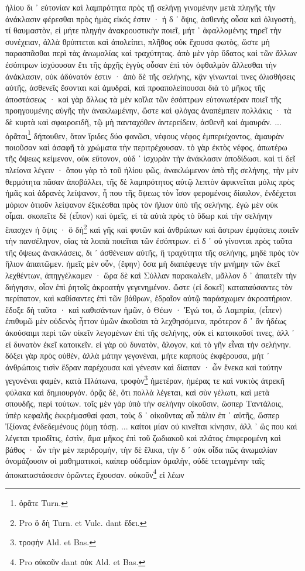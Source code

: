 \documentclass[a4paper, 11pt, oneside, polutonikogreek, german]{article}
\begin{document}
ἡλίου δι ᾽ εὐτονίαν καὶ λαμπρότητα πρὸς τῇ σελήνῃ γινομένην μετὰ πληγῆς τὴν ἀνάκλασιν φέρεσθαι πρὸς ἡμὰς εἰκός ἐστιν · ἡ δ ᾽ ὄψις, ἀσθενὴς οὖσα καὶ ὀλιγοστὴ, τί θαυμαστὸν, εἰ μήτε πληγὴν ἀνακρουστικὴν ποιεῖ, μήτ ᾽ ἀφαλλομένης τηρεῖ τὴν συνέχειαν, ἀλλὰ θρύπτεται καὶ ἀπολείπει, πλῆθος οὐκ ἔχουσα φωτὸς, ὥστε μὴ παρασπᾶσθαι περὶ τὰς ἀνωμαλίας καὶ τραχύτητας. ἀπὸ μὲν γὰρ ὕδατος καὶ τῶν ἄλλων ἐσόπτρων ἰσχύουσαν ἔτι τῆς ἀρχῆς ἐγγὺς οὖσαν ἐπὶ τὸν ὀφθαλμὸν ἅλλεσθαι τὴν ἀνάκλασιν, οὐκ ἀδύνατόν ἐστιν · ἀπὸ δὲ τῆς σελήνης, κᾂν γίνωνταὶ τινες ὀλισθήσεις αὐτῆς, ἀσθενεῖς ἔσονται καὶ ἀμυδραὶ, καὶ προαπολείπουσαι διὰ τὸ μῆκος τῆς ἀποστάσεως · καὶ γὰρ ἄλλως τὰ μὲν κοῖλα τῶν ἐσόπτρων εὐτονωτέραν ποιεῖ τῆς προηγουμένης αὐγῆς τὴν ἀνακλωμένην, ὥστε καὶ φλόγας ἀναπέμπειν πολλάκις · τὰ δὲ κυρτὰ καὶ σφαιροειδῆ, τῷ μὴ πανταχόθεν ἀντερείδειν, ἀσθενῆ καὶ ἀμαυράν. ... ὁρᾶται\footnote{ὁρᾶτε Turn.} δήπουθεν, ὅταν ἴριδες δύο φανῶσι, νέφους νέφος ἐμπεριέχοντος, ἀμαυρὰν ποιοῦσαν καὶ ἀσαφῆ τὰ χρώματα τὴν περιτρέχουσαν. τὸ γὰρ ἐκτὸς νέφος, ἀπωτέρω τῆς ὄψεως κείμενον, οὐκ εὔτονον, οὐδ ᾽ ἰσχυρὰν τὴν ἀνάκλασιν ἀποδίδωσι. καὶ τί δεῖ πλείονα λέγειν · ὅπου γὰρ τὸ τοῦ ἡλίου φῶς, ἀνακλώμενον ἀπὸ τῆς σελήνης, τὴν μὲν θερμότητα πᾶσαν ἀποβάλλει, τῆς δὲ λαμπρότητος αὐτῷ λεπτὸν ἀφικνεῖται μόλις πρὸς ἡμᾶς καὶ ἀδρανὲς λείψανον, ἦ που τῆς ὄψεως τὸν ἶσον φερομένοις δίαυλον, ἐνδέχεται μόριον ὁτιοῦν λείψανον ἐξικέσθαι πρὸς τὸν ἥλιον ὑπὸ τῆς σελήνης. ἐγὼ μὲν οὐκ οἶμαι. σκοπεῖτε δὲ (εἶπον) καὶ ὑμεῖς, εἰ τὰ αὐτὰ πρὸς τὸ ὕδωρ καὶ τὴν σελήνην ἔπασχεν ἡ ὄψις · ὃ δὴ\footnote{Pro ὃ δὴ Turn. et Vulc. dant ἔδει.} καὶ γῆς καὶ φυτῶν καὶ ἀνθρώπων καὶ ἄστρων ἐμφάσεις ποιεῖν τὴν πανσέληνον, οἵας τὰ λοιπὰ ποιεῖται τῶν ἐσόπτρων. εὶ δ ᾽ οὐ γίνονται πρὸς ταῦτα τῆς ὄψεως ἀνακλάσεις, δι ᾽ ἀσθένειαν αὐτῆς, ἢ τραχύτητα τῆς σελήνης, μηδὲ πρὸς τὸν ἥλιον ἀπαιτῶμεν. ἡμεῖς μὲν οὖν, (ἔφην) ὅσα μὴ διαπέφευγε τὴν μνήμην τῶν ἐκεῖ λεχθέντων, ἀπηγγέλκαμεν · ὥρα δὲ καὶ Σύλλαν παρακαλεῖν, μᾶλλον δ ᾽ ἀπαιτεῖν τὴν διήγησιν, οἷον ἐπὶ ῥητοῖς ἀκροατὴν γεγενημένον. ὥστε (εἰ δοκεῖ) καταπαύσαντες τὸν περίπατον, καὶ καθίσαντες ἐπὶ τῶν βάθρων, ἑδραῖον αὐτῷ παράσχωμεν ἀκροατήριον. ἔδοξε δὴ ταῦτα · καὶ καθισάντων ἡμῶν, ὁ Θέων · Ἐγώ τοι, ὦ Λαμπρία, (εἶπεν) ἐπιθυμῶ μὲν οὐδενὸς ἧττον ὑμῶν ἀκοῦσαι τὰ λεχθησόμενα, πρότερον δ ᾽ ἂν ἡδέως ἀκούσαιμι περὶ τῶν οἰκεῖν λεγομένων ἐπὶ τῆς σελήνης, οὐκ εἰ κατοικοῦσί τινες, ἀλλ ᾽ εἰ δυνατὸν ἐκεῖ κατοικεῖν. εἰ γὰρ οὐ δυνατὸν, ἄλογον, καὶ τὸ γῆν εἶναι τὴν σελήνην. δόξει γὰρ πρὸς οὐθὲν, ἀλλὰ μάτην γεγονέναι, μήτε καρποὺς ἐκφέρουσα, μήτ ᾽ ἀνθρώποις τισὶν ἕδραν παρέχουσα καὶ γένεσιν καὶ δίαιταν · ὧν ἕνεκα καὶ ταύτην γεγονέναι φαμὲν, κατὰ Πλάτωνα, τροφὸν\footnote{τροφὴν Ald. et Bas.} ἡμετέραν, ἡμέρας τε καὶ νυκτὸς ἀτρεκῆ φύλακα καὶ δημιουργόν. ὁρᾷς δὲ, ὅτι πολλὰ λέγεται, καὶ σὺν γέλωτι, καὶ μετὰ σπουδῆς, περὶ τούτων. τοῖς μὲν γὰρ ὑπὸ τὴν σελήνην οἰκοῦσιν, ὥσπερ Ταντάλοις, ὑπὲρ κεφαλῆς ἐκκρέμασθαί φασι, τοὺς δ ᾽ οἰκοῦντας αὖ πάλιν ἐπ ᾽ αὐτῆς, ὥσπερ Ἰξίονας ἐνδεδεμένους ῥύμῃ τόσῃ. ... καίτοι μίαν οὐ κινεῖται κίνησιν, ἀλλ ᾽ ὥς που καὶ λέγεται τριοδῖτις, ἐστὶν, ἅμα μῆκος ἐπὶ τοῦ ζωδιακοῦ καὶ πλάτος ἐπιφερομένη καὶ βάθος · ὧν τὴν μὲν περιδρομὴν, τὴν δὲ ἕλικα, τὴν δ ᾽ οὐκ οἶδα πῶς ἀνωμαλίαν ὀνομάζουσιν οἱ μαθηματικοὶ, καίπερ οὐδεμίαν ὁμαλὴν, οὐδὲ τεταγμένην ταῖς ἀποκαταστάσεσιν ὁρῶντες ἔχουσαν. οὐκοῦν\footnote{Pro οὐκοῦν dant οὐκ Ald. et Bas.} εἰ λέων 
\end{document}
